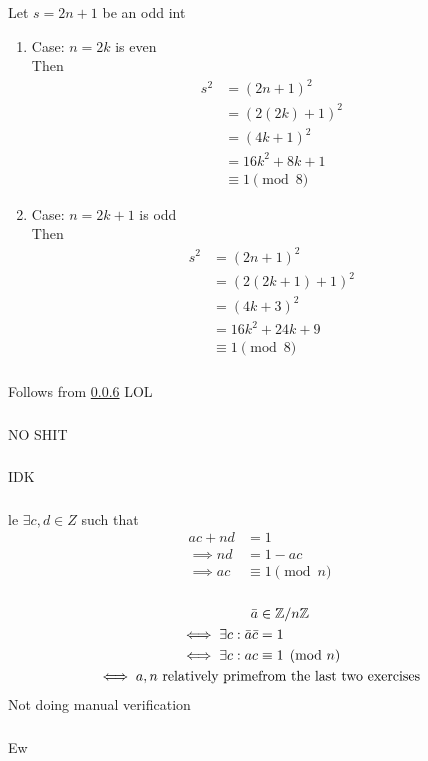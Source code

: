 \documentclass{article}
\begin{document}
\subsubsection{}
Let $s=2n+1$ be an odd int
\begin{enumerate}
\item Case: $n = 2k$ is even\\
Then
\begin{align*}
s^2 &= (2n+1)^2\\
&= (2(2k) + 1)^2\\
&= (4k + 1)^2\\
&= 16k^2 + 8k + 1\\
&\equiv 1 \pmod{8}
\end{align*}
\item Case: $n = 2k+1$ is odd\\
Then
\begin{align*}
s^2 &= (2n+1)^2\\
&= (2(2k+1) + 1)^2\\
&= (4k + 3)^2\\
&= 16k^2 + 24k + 9\\
&\equiv 1 \pmod{8}
\end{align*}
\end{enumerate}
\subsubsection{}
Follows from \ref{0p3p14} LOL
\subsubsection{}
NO SHIT 
\subsubsection{}
IDK
\subsubsection{}
le $\exists c,d \in Z$ such that
\begin{align*}
ac + nd &= 1\\
\implies nd &= 1-ac\\
\implies ac &\equiv 1 \pmod{n}
\end{align*}
\subsubsection{} \label{0p3p14}
\begin{align*}
\bar{a} &\in \mathbb{Z}/n\mathbb{Z}\\
\iff \exists c: \bar{a}\bar{c} &= 1\\
\iff \exists c: ac &\equiv 1 \pmod{n}\\
\iff a,n \text{ relatively prime} & \text{from the last two exercises}
\end{align*}
Not doing manual verification
\subsubsection{}
Ew
\end{document}
